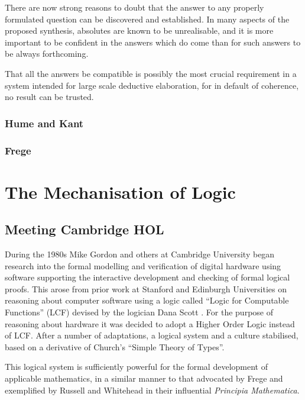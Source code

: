 \documentclass[10pt,titlepage]{book}
\begin{document}
There are now strong reasons to doubt that the answer to any properly formulated question can be discovered and established.
In many aspects of the proposed synthesis, absolutes are known to be unrealisable, and it is more important to be confident in the answers which do come than for such answers to be always forthcoming.

That all the answers be compatible is possibly the most crucial requirement in a system intended for large scale deductive elaboration, for in default of coherence, no result can be trusted.

\subsection{Hume and Kant}



\subsection{Frege}

\cite{frege1980}


\chapter{The Mechanisation of Logic}

\section{Meeting Cambridge HOL}

During the 1980s Mike Gordon and others at Cambridge University began research into the formal modelling and verification of digital hardware using software supporting the interactive development and checking of formal logical proofs.
This arose from prior work at Stanford and Edinburgh Universities on reasoning about computer software using a logic called ``Logic for Computable Functions'' (LCF) devised by the logician Dana Scott \cite{scott1993type}.
For the purpose of reasoning about hardware it was decided to adopt a Higher Order Logic instead of LCF.
After a number of adaptations, a logical system and a culture stabilised, based on a derivative of Church's ``Simple Theory of Types''\cite{churchSTT}.

This logical system is sufficiently powerful for the formal development of applicable mathematics, in a similar manner to that advocated by Frege and exemplified by Russell and Whitehead in their influential \emph{Principia Mathematica}\cite{russell10}.
\end{document}
